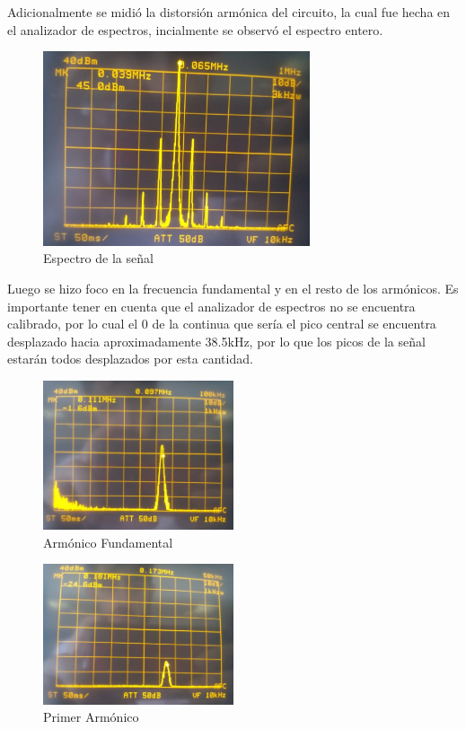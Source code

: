 Adicionalmente se midió la distorsión armónica del circuito, la cual fue hecha en el analizador de espectros, incialmente se observó el espectro entero.
\begin{figure}[H]
	\centering
	\includegraphics[width=0.7\textwidth]{Imagenes-Ej1/Espectro.jpeg}
	\caption{Espectro de la señal}
	\label{fig:Espectro}
\end{figure}
Luego se hizo foco en la frecuencia fundamental y en el resto de los armónicos. Es importante tener en cuenta que el analizador de espectros no se encuentra calibrado, por lo cual el 0 de la continua que sería el pico central se encuentra desplazado hacia aproximadamente 38.5kHz, por lo que los picos de la señal estarán todos desplazados por esta cantidad.
\begin{figure}[H]
	\centering
	\includegraphics[width=0.5\textwidth]{Imagenes-Ej1/Fundamental.jpeg}
	\caption{Armónico Fundamental}
	\label{fig:Fund}
\end{figure}
\begin{figure}[H]
	\centering
	\includegraphics[width=0.5\textwidth]{Imagenes-Ej1/1Armonico.jpeg}
	\caption{Primer Armónico}
	\label{fig:1er}
\end{figure}
